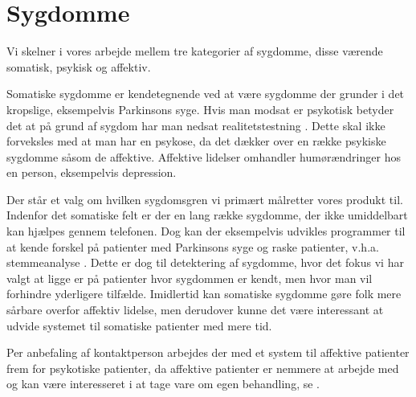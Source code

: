 \section{Sygdomme}
Vi skelner i vores arbejde mellem tre kategorier af sygdomme, disse værende somatisk, psykisk og affektiv.

Somatiske sygdomme er kendetegnende ved at være sygdomme der grunder i det kropslige, eksempelvis Parkinsons syge.
Hvis man modsat er psykotisk betyder det at på grund af sygdom har man nedsat realitetstestning \citep{misc:netpsykpsykose}.
Dette skal ikke forveksles med at man har en psykose, da det dækker over en række psykiske sygdomme såsom de affektive\citep{misc:netpsykpsykose}.
Affektive lidelser omhandler humørændringer hos en person, eksempelvis depression.

Der står et valg om hvilken sygdomsgren vi primært målretter vores produkt til.
Indenfor det somatiske felt er der en lang række sygdomme, der ikke umiddelbart kan hjælpes gennem telefonen.
Dog kan der eksempelvis udvikles programmer til at kende forskel på patienter med Parkinsons syge og raske patienter, v.h.a. stemmeanalyse \citep{6168572}.
Dette er dog til detektering af sygdomme, hvor det fokus vi har valgt at ligge er på patienter hvor sygdommen er kendt, men hvor man vil forhindre yderligere tilfælde.
Imidlertid kan somatiske sygdomme gøre folk mere sårbare overfor affektiv lidelse, men derudover kunne det være interessant at udvide systemet til somatiske patienter med mere tid.

Per anbefaling af kontaktperson \citep{misc:janne-rasmussen} arbejdes der med et system til affektive patienter frem for psykotiske patienter, da affektive patienter er nemmere at arbejde med og kan være interesseret i at tage vare om egen behandling, se .